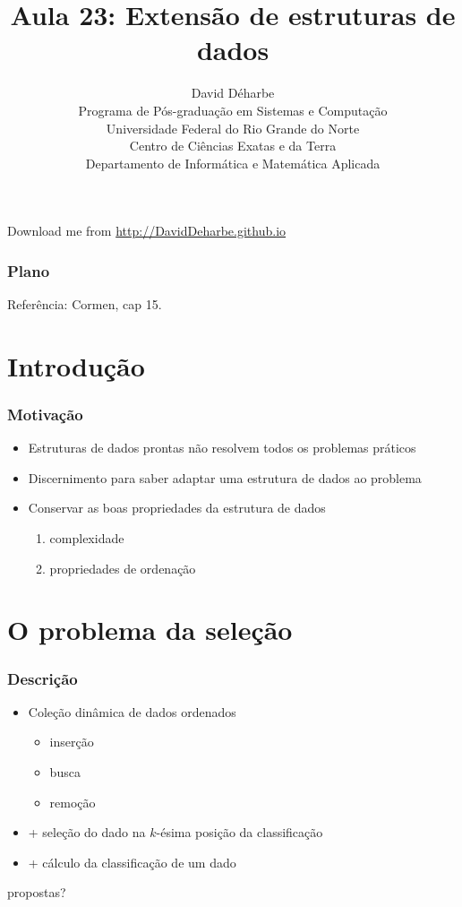 \documentclass{beamer}
\title{Aula 23: Extensão de estruturas de dados}
\author{David Déharbe \\
  Programa de Pós-graduação em Sistemas e Computação \\
  Universidade Federal do Rio Grande do Norte \\
  Centro de Ciências Exatas e da Terra \\
  Departamento de Informática e Matemática Aplicada}
\date{}
\begin{document}

\begin{frame}
  \titlepage

  Download me from \url{http://DavidDeharbe.github.io}
\end{frame}

\begin{frame}
  \frametitle{Plano}
  \tableofcontents

Referência: Cormen, cap 15.
\end{frame}

\section{Introdução}

\begin{frame}
\frametitle{Motivação}

\begin{itemize}
\item Estruturas de dados prontas não resolvem todos os problemas práticos
\item Discernimento para saber adaptar uma estrutura de dados ao problema
\item Conservar as boas propriedades da estrutura de dados
\begin{enumerate}
  \item complexidade
  \item propriedades de ordenação
\end{enumerate}
\end{itemize}
\end{frame}

\section{O problema da seleção}

\begin{frame}

\frametitle{Descrição}

\begin{itemize}
\item Coleção dinâmica de dados ordenados
\begin{itemize}
\item inserção
\item busca
\item remoção
\end{itemize}
\item + seleção do dado na $k$-ésima posição da classificação
\item + cálculo da classificação de um dado
\end{itemize}
\pause
\alert{propostas?}

\end{frame}
\end{document}
